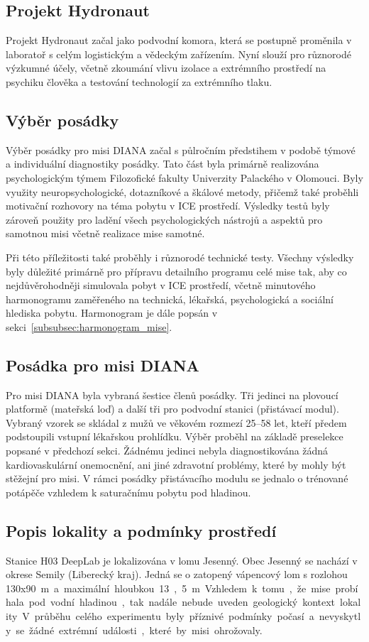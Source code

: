 \subsection{Projekt Hydronaut}
\label{subsec:projekt_hydronaut}
Projekt Hydronaut začal jako podvodní komora, která se postupně proměnila v
laboratoř s celým logistickým a vědeckým zařízením. Nyní slouží pro různorodé
výzkumné účely, včetně zkoumání vlivu izolace a extrémního prostředí na psychiku
člověka a testování technologií za extrémního tlaku.

\subsection{Výběr posádky}
\label{subsec:vyber_posadky}
Výběr posádky pro misi DIANA začal s půlročním předstihem v podobě týmové a
individuální diagnostiky posádky. Tato část byla primárně realizována
psychologickým týmem Filozofické fakulty Univerzity Palackého v Olomouci. Byly
využity neuropsychologické, dotazníkové a škálové metody, přičemž také proběhli
motivační rozhovory na téma pobytu v ICE prostředí. Výsledky testů byly zároveň
použity pro ladění všech psychologických nástrojů a aspektů pro samotnou misi
včetně realizace mise samotné.

Při této příležitosti také proběhly i různorodé technické testy. Všechny
výsledky byly důležité primárně pro přípravu detailního programu celé mise tak,
aby co nejdůvěrohodněji simulovala pobyt v ICE prostředí, včetně minutového
harmonogramu zaměřeného na technická, lékařská, psychologická a sociální
hlediska pobytu. Harmonogram je dále popsán v
sekci~\ref{subsubsec:harmonogram_mise}.

\subsection{Posádka pro misi DIANA}
Pro misi DIANA byla vybraná šestice členů posádky. Tři jedinci na plovoucí
platformě (mateřská loď) a další tři pro podvodní stanici (přistávací modul).
Vybraný vzorek se skládal z mužů ve věkovém rozmezí 25--58 let, kteří předem
podstoupili vstupní lékařskou prohlídku. Výběr proběhl na základě preselekce
popsané v předchozí sekci. Žádnému jedinci nebyla diagnostikována žádná
kardiovaskulární onemocnění, ani jiné zdravotní problémy, které by mohly být
stěžejní pro misi. V rámci posádky přistávacího modulu se jednalo o trénované
potápěče vzhledem k saturačnímu pobytu pod hladinou.

\subsection{Popis lokality a podmínky prostředí}
\label{subsec:diana_lokalita}
Stanice H03 DeepLab je lokalizována v lomu Jesenný. Obec Jesenný se nachází v
okrese Semily (Liberecký kraj). Jedná se o zatopený vápencový lom s rozlohou
130x90~\si\meter~a maximální hloubkou 13,5~\si\meter. Vzhledem k tomu, že mise
probíhala pod vodní hladinou, tak nadále nebude uveden geologický kontext
lokality. V průběhu celého experimentu byly příznivé podmínky počasí a
nevyskytly se žádné extrémní události, které by misi ohrožovaly.


